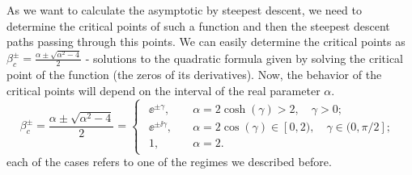 \begin{exemplo}
	As we want to calculate the asymptotic by steepest descent, we need to determine the critical points of such a function and then the steepest descent paths passing through this points. We can easily determine the critical points as $\beta_c^\pm = \frac{\alpha \pm \sqrt{{\alpha}^2 - 4}}{2}$ - solutions to the quadratic formula given by solving the critical point of the function (the zeros of its derivatives). Now, the behavior of the critical points will depend on the interval of the real parameter $\alpha$. 
	\begin{equation}
		\beta_c^{\pm} = \frac{\alpha \pm \sqrt{\alpha^2 - 4}}{2} =
		\begin{cases}
			\begin{aligned}
				\ee^{\pm \gamma}, \quad & \alpha = 2 \cosh{(\gamma)} > 2, \quad \gamma > 0; \\
				\ee^{\pm \ii \gamma}, \quad & \alpha = 2 \cos{(\gamma)} \in [0,2), \quad \gamma \in (0,\pi/2]; \\
				1, \quad & \alpha = 2.
			\end{aligned}
		\end{cases}
	\end{equation}
	each of the cases refers to one of the regimes we described before.
\end{exemplo}
